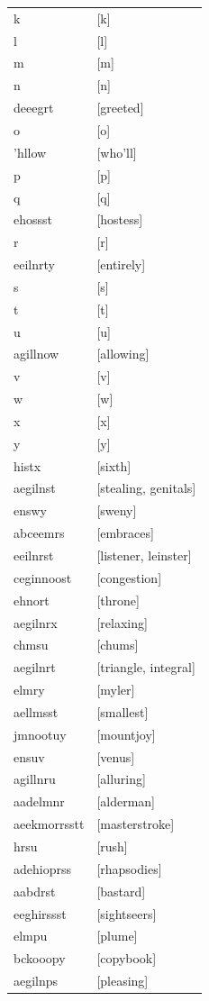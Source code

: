 \documentclass{article}
\begin{document}
\begin{tabular}{ll}
k & [k] \\
l & [l] \\
m & [m] \\
n & [n] \\
deeegrt & [greeted] \\
o & [o] \\
'hllow & [who'll] \\
p & [p] \\
q & [q] \\
ehossst & [hostess] \\
r & [r] \\
eeilnrty & [entirely] \\
s & [s] \\
t & [t] \\
u & [u] \\
agillnow & [allowing] \\
v & [v] \\
w & [w] \\
x & [x] \\
y & [y] \\
histx & [sixth] \\
aegilnst & [stealing, genitals] \\
enswy & [sweny] \\
abceemrs & [embraces] \\
eeilnrst & [listener, leinster] \\
ceginnoost & [congestion] \\
ehnort & [throne] \\
aegilnrx & [relaxing] \\
chmsu & [chums] \\
aegilnrt & [triangle, integral] \\
elmry & [myler] \\
aellmsst & [smallest] \\
jmnootuy & [mountjoy] \\
ensuv & [venus] \\
agillnru & [alluring] \\
aadelmnr & [alderman] \\
aeekmorrsstt & [masterstroke] \\
hrsu & [rush] \\
adehioprss & [rhapsodies] \\
aabdrst & [bastard] \\
eeghirssst & [sightseers] \\
elmpu & [plume] \\
bckooopy & [copybook] \\
aegilnps & [pleasing] \\

\end{tabular}
\end{document}
